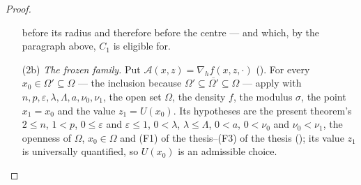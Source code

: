 \begin{proof}
\begin{enumerate}
  before its radius and therefore before the centre --- and which, by the
  paragraph above, $C_1$ is eligible for.
\item[(2b)] \emph{The frozen family.}  Put
  $\mathcal A(x,z)=\nabla_hf(x,z,\cdot)$
  ().  For every $x_0\in\Omega'\subseteq\Omega$
  --- the inclusion because $\Omega'\subseteq\overline{\Omega'}\subseteq\Omega$
  --- apply  with
  $n,p,\varepsilon,\lambda,\Lambda,a,\nu_0,\nu_1$, the open set $\Omega$, the
  density $f$, the modulus $\sigma$, the point $x_1=x_0$ and the value
  $z_1=U(x_0)$.  Its hypotheses are the present
  theorem's $2\le n$, $1<p$, $0\le\varepsilon$ and $\varepsilon\le1$,
  $0<\lambda$, $\lambda\le\Lambda$,
  $0<a$, $0<\nu_0$ and $\nu_0<\nu_1$, the openness of $\Omega$, $x_0\in\Omega$
  and (F1) of the thesis--(F3) of the thesis (); its
  value $z_1$ is universally quantified, so $U(x_0)$ is an admissible choice.


\end{enumerate}
\end{proof}
